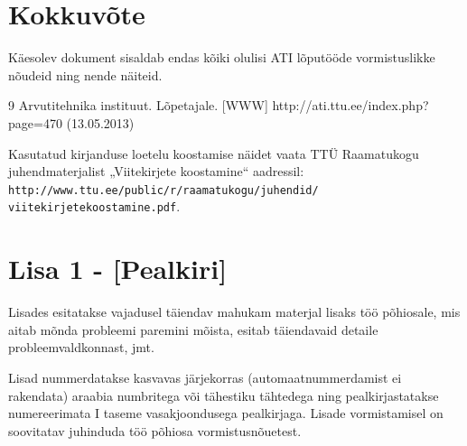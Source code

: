 \documentclass[12pt]{article} %
\begin{document}
\pagebreak

\section{Kokkuvõte}
\label{Kokkuvõte} %
Käesolev dokument sisaldab endas kõiki olulisi ATI lõputööde vormistuslikke nõudeid ning nende näiteid.

\pagebreak



\begin{thebibliography} {9}
Arvutitehnika instituut. Lõpetajale. [WWW] http://ati.ttu.ee/index.php?page=470 (13.05.2013)
\end{thebibliography}

Kasutatud kirjanduse loetelu koostamise näidet vaata TTÜ Raamatukogu juhendmaterjalist „Viitekirjete koostamine“ aadressil: \texttt{http://www.ttu.ee/public/r/raamatukogu/juhendid/
viitekirjetekoostamine.pdf}.
\pagebreak

\section*{Lisa 1 - [Pealkiri]}

Lisades esitatakse vajadusel täiendav mahukam materjal lisaks töö põhiosale, mis aitab mõnda probleemi paremini mõista, esitab täiendavaid detaile probleemvaldkonnast, jmt. 

Lisad nummerdatakse kasvavas järjekorras (automaatnummerdamist ei rakendata) araabia numbritega või tähestiku tähtedega ning pealkirjastatakse numereerimata I taseme vasakjoondusega pealkirjaga. Lisade vormistamisel on soovitatav juhinduda töö põhiosa vormistusnõuetest. 
\end{document}
